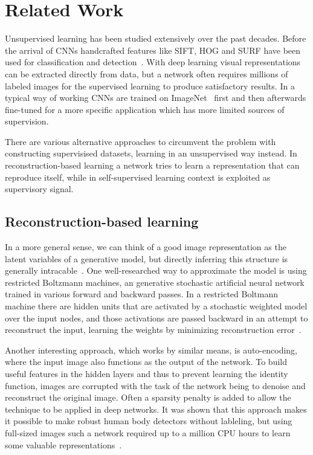 %
\newpage
\chapter{Related Work}
\label{ch:related_work}
Unsupervised learning has been studied extensively over the past decades. Before the arrival of CNNs handcrafted features like SIFT, HOG and SURF have been used for classification and detection~\cite{lee2017}\needref. With deep learning visual representations can be extracted directly from data, but a network often requires millions of labeled images for the supervised learning to produce satisfactory results. In a typical way of working CNNs are trained on ImageNet~\cite{deng2009} first and then afterwards fine-tuned for a more specific application which has more limited sources of supervision. 

There are various alternative approaches to circumvent the problem with constructing supervisised datasets, learning in an unsupervised way instead. In reconstruction-based learning a network tries to learn a representation that can reproduce itself, while in self-supervised learning context is exploited as supervisory signal.

\section{Reconstruction-based learning}
In a more general sense, we can think of a good image representation as the latent variables of a generative model, but directly inferring this structure is generally intracable~\cite{doersch2015}. One well-researched way to approximate the model is using restricted Boltzmann machines, an generative stochastic artificial neural network trained in various forward and backward passes. In a restricted Boltmann machine there are hidden units that are activated by a stochastic weighted model over the input nodes, and those activations are passed backward in an attempt to reconstruct the input, learning the weights by minimizing reconstruction error~\cite{smolensky1986}. 

Another interesting approach, which works by similar means, is auto-encoding, where the input image also functions as the output of the network. To build useful features in the hidden layers and thus to prevent learning the identity function, images are corrupted with the task of the network being to denoise and reconstruct the original image. Often a sparsity penalty is added to allow the technique to be applied in deep networks. It was shown that this approach makes it possible to make robust human body detectors without lableling, but using full-sized images such a network required up to a million CPU hours to learn some valuable representations~\cite{le2013}.  

